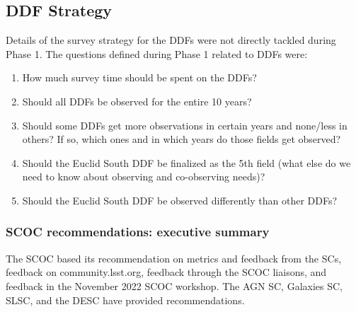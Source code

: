 \subsection{DDF Strategy}\label{q:DDF}

Details of the survey strategy for the DDFs were not directly tackled during Phase 1. The questions defined during Phase 1 related to DDFs were:

\begin{enumerate}
\item How much survey time should be spent on the DDFs?
\item Should all DDFs be observed for the entire 10 years?
\item Should some DDFs get more observations in certain years and none/less in others? If so, which ones and in which years do those fields get observed?
\item Should the Euclid South DDF be finalized as the 5th field (what else do we need to know about observing and co-observing needs)? 
\item Should the Euclid South DDF be observed differently than other DDFs?
\end{enumerate}
 
 \subsubsection{SCOC recommendations: executive summary}\label{sec:ddfes}
 
The SCOC based its recommendation on metrics and feedback from the SCs,  feedback on community.lsst.org, feedback through the SCOC liaisons, and feedback in the November 2022 SCOC workshop. The AGN SC, Galaxies SC, SLSC, and the DESC have provided recommendations. 


